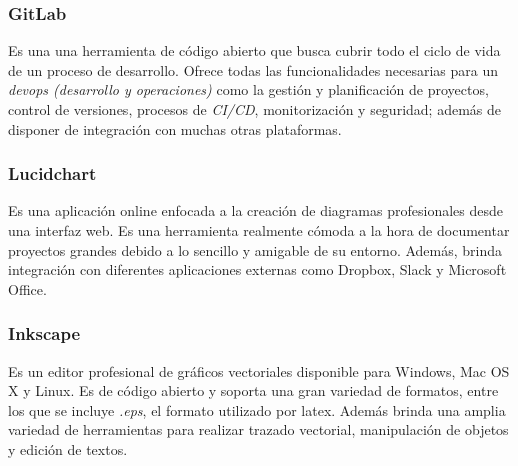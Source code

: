         \subsubsection{GitLab}
            Es una una herramienta de código abierto que busca cubrir todo el ciclo de vida de un proceso de desarrollo. Ofrece todas las funcionalidades necesarias para un \textit{devops (desarrollo y operaciones)} como la gestión y planificación de proyectos, control de versiones, procesos de \textit{CI/CD}, monitorización y seguridad; además de disponer de integración con muchas otras plataformas. \cite{gitlab}

        \subsubsection{Lucidchart}
            Es una aplicación online enfocada a la creación de diagramas profesionales desde una interfaz web. Es una herramienta realmente cómoda a la hora de documentar proyectos grandes debido a lo sencillo y amigable de su entorno. Además, brinda integración con diferentes aplicaciones externas como Dropbox, Slack y Microsoft Office. 

        \subsubsection{Inkscape}
            Es un editor profesional de gráficos vectoriales disponible para Windows, Mac OS X y Linux. Es de código abierto y soporta una gran variedad de formatos, entre los que se incluye \textit{.eps}, el formato utilizado por latex. Además brinda una amplia variedad de herramientas para realizar trazado vectorial, manipulación de objetos y edición de textos.
